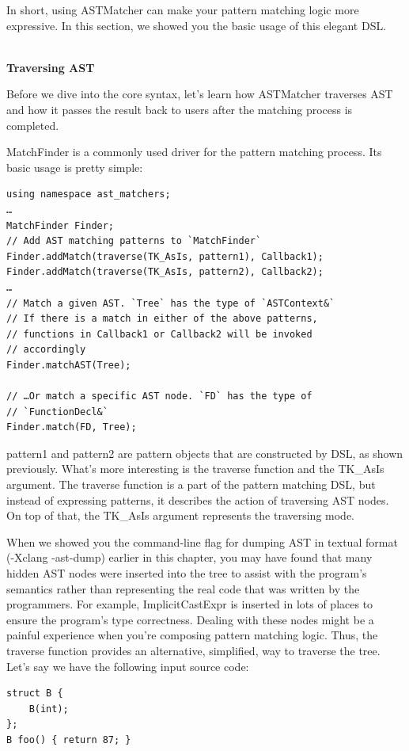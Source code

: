 In short, using ASTMatcher can make your pattern matching logic more expressive. In this section, we showed you the basic usage of this elegant DSL.

\hspace*{\fill} \\ %
\noindent
\textbf{Traversing AST}

Before we dive into the core syntax, let's learn how ASTMatcher traverses AST and how it passes the result back to users after the matching process is completed. 

MatchFinder is a commonly used driver for the pattern matching process. Its basic usage is pretty simple:

\begin{lstlisting}[style=styleCXX]
using namespace ast_matchers;
…
MatchFinder Finder;
// Add AST matching patterns to `MatchFinder`
Finder.addMatch(traverse(TK_AsIs, pattern1), Callback1);
Finder.addMatch(traverse(TK_AsIs, pattern2), Callback2);
…
// Match a given AST. `Tree` has the type of `ASTContext&`
// If there is a match in either of the above patterns,
// functions in Callback1 or Callback2 will be invoked
// accordingly
Finder.matchAST(Tree);

// …Or match a specific AST node. `FD` has the type of
// `FunctionDecl&`
Finder.match(FD, Tree);
\end{lstlisting}

pattern1 and pattern2 are pattern objects that are constructed by DSL, as shown previously. What's more interesting is the traverse function and the TK\_AsIs argument. The traverse function is a part of the pattern matching DSL, but instead of expressing patterns, it describes the action of traversing AST nodes. On top of that, the TK\_AsIs argument represents the traversing mode.

When we showed you the command-line flag for dumping AST in textual format (-Xclang -ast-dump) earlier in this chapter, you may have found that many hidden AST nodes were inserted into the tree to assist with the program's semantics rather than representing the real code that was written by the programmers. For example, ImplicitCastExpr is inserted in lots of places to ensure the program's type correctness. Dealing with these nodes might be a painful experience when you're composing pattern matching logic. Thus, the traverse function provides an alternative, simplified, way to traverse the tree. Let's say we have the following input source code:

\begin{lstlisting}[style=styleCXX]
struct B {
	B(int);
};
B foo() { return 87; }
\end{lstlisting}


